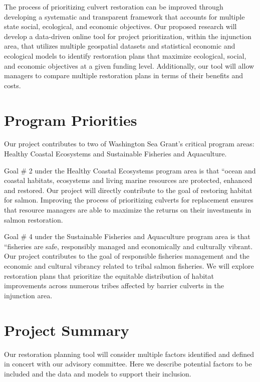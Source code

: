 \documentclass[12pt]{elsarticle}
\begin{document}
The process of prioritizing culvert restoration can be improved through developing a systematic and transparent framework that accounts for multiple state social, ecological, and economic objectives. Our proposed research will develop a data-driven online tool for project prioritization, within the injunction area, that utilizes multiple geospatial datasets and statistical economic and ecological models to identify restoration plans that maximize ecological, social, and economic objectives at a given funding level. Additionally, our tool will allow managers to compare multiple restoration plans in terms of their benefits and costs.

\section{Program Priorities}


Our project contributes to two of Washington Sea Grant's critical program areas: Healthy Coastal Ecosystems and Sustainable Fisheries and Aquaculture. 

Goal \# 2 under the Healthy Coastal Ecosystems program area is that ``ocean and coastal habitats, ecosystems and living marine resources are protected, enhanced and restored. Our project will directly contribute to the goal of restoring habitat for salmon. Improving the process of prioritizing culverts for replacement ensures that resource managers are able to maximize the returns on their investments in salmon restoration.

Goal \# 4 under the Sustainable Fisheries and Aquaculture program area is that ``fisheries are safe, responsibly managed and economically and culturally vibrant. Our project contributes to the goal of responsible fisheries management and the economic and cultural vibrancy related to tribal salmon fisheries. We will explore restoration plans that prioritize the equitable distribution of habitat improvements across numerous tribes affected by barrier culverts in the injunction area. 

\section{Project Summary}


Our restoration planning tool will consider multiple factors identified and defined in concert with our advisory committee. Here we describe potential factors to be included and the data and models to support their inclusion.   
\end{document}
